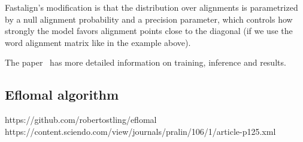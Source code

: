 Fastalign's modification is that the distribution over alignments is parametrized by a null alignment probability and a precision parameter, which controls how strongly the model favors alignment points close to the diagonal (if we use the word alignment matrix like in the example above).

The paper~\cite{dyer-etal-2013-simple} has more detailed information on training, inference and results.

\subsection{Eflomal algorithm}

https://github.com/robertostling/eflomal
https://content.sciendo.com/view/journals/pralin/106/1/article-p125.xml